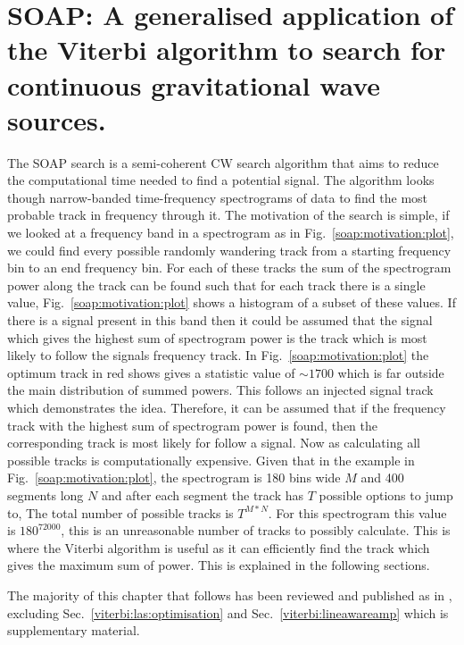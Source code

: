 \chapter{\label{soap}SOAP: A generalised application of the Viterbi algorithm to search for continuous gravitational wave sources.}

The SOAP search is a semi-coherent \ac{CW} search algorithm that aims to reduce the computational time needed to find a potential signal. 
The algorithm looks though narrow-banded time-frequency spectrograms of data to find the most probable track in frequency through it.
The motivation of the search is simple, if we looked at a frequency band in a spectrogram as in Fig.~\ref{soap:motivation:plot}, we could find every possible randomly wandering track from a starting frequency bin to an end frequency bin. For each of these tracks the sum of the spectrogram power along the track can be found such that for each track there is a single value, Fig.~\ref{soap:motivation:plot} shows a histogram of a subset of these values. If there is a signal present in this band then it could be assumed that the signal which gives the highest sum of spectrogram power is the track which is most likely to follow the signals frequency track. 
In Fig.~\ref{soap:motivation:plot} the optimum track in red shows gives a statistic value of $\sim 1700$ which is far outside the main distribution of summed powers. 
This follows an injected signal track which demonstrates the idea. 
Therefore, it can be assumed that if the frequency track with the highest sum of spectrogram power is found, then the corresponding track is most likely for follow a signal. 
Now as calculating all possible tracks is computationally expensive. Given that in the example in Fig.~\ref{soap:motivation:plot}, the spectrogram is 180 bins wide $M$ and 400 segments long $N$ and after each segment the track has $T$ possible options to jump to, The total number of possible tracks is $T^{M*N}$. For this spectrogram this value is $180^{72000}$, this is an unreasonable number of tracks to possibly calculate. This is where the Viterbi algorithm \citep{viterbi1967ErrorBounds} is useful as it can efficiently find the track which gives the maximum sum of power. This is explained in the following sections.

The majority of this chapter that follows has been reviewed and published as in \citep{bayley2019GeneralizedApplication}, excluding Sec.~\ref{viterbi:las:optimisation} and Sec.~\ref{viterbi:lineawareamp} which is supplementary material.


